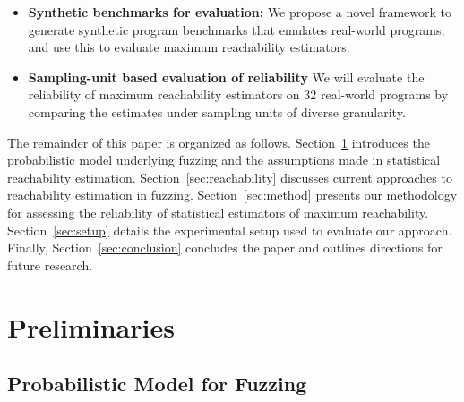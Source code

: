 \documentclass[conference]{IEEEtran}
\begin{document}
\begin{itemize}
  \item \textbf{Synthetic benchmarks for evaluation:} We propose a novel
framework to generate synthetic program benchmarks that emulates real-world
programs, and use this to evaluate maximum reachability estimators.

  \item \textbf{Sampling-unit based evaluation of reliability} We will evaluate
    the reliability of maximum reachability estimators on 32 real-world programs
    by comparing the estimates under sampling units of diverse granularity.

    

\end{itemize}

The remainder of this paper is organized as follows. Section~\ref{sec:model} introduces the probabilistic model underlying fuzzing and the assumptions made in statistical reachability estimation. Section~\ref{sec:reachability} discusses current approaches to reachability estimation in fuzzing. Section~\ref{sec:method} presents our methodology for assessing the reliability of statistical estimators of maximum reachability. Section~\ref{sec:setup} details the experimental setup used to evaluate our approach. Finally, Section~\ref{sec:conclusion} concludes the paper and outlines directions for future research.

\section{Preliminaries} \label{sec:model}

\subsection{Probabilistic Model for Fuzzing}
\end{document}
